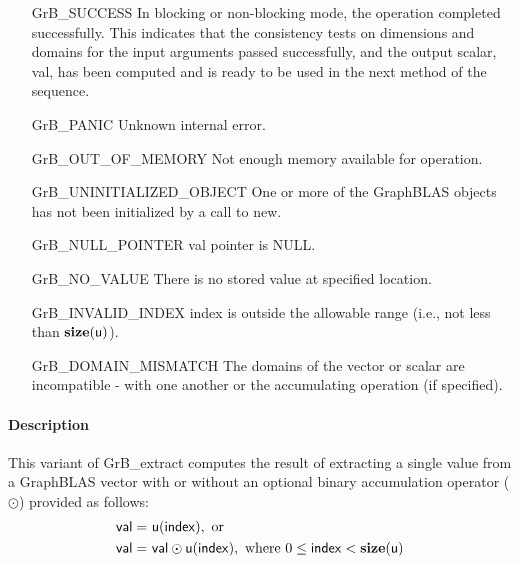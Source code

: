 \begin{itemize}[leftmargin=2.1in]
    \item[{\sf GrB\_SUCCESS}]  In blocking or non-blocking mode, the operation 
    completed successfully. This indicates that the consistency tests on 
    dimensions and domains for the input arguments passed successfully, and
    the output scalar, {\sf val}, has been computed and is ready to be used in 
    the next method of the sequence.

    \item[{\sf GrB\_PANIC}]   Unknown internal error.
    
    \item[{\sf GrB\_OUT\_OF\_MEMORY}]  Not enough memory available for operation.
    
    \item[{\sf GrB\_UNINITIALIZED\_OBJECT}]  One or more of the GraphBLAS 
    objects has not been initialized by a call to {\sf new}.
    
    \item[{\sf GrB\_NULL\_POINTER}]    {\sf val} pointer is {\sf NULL}.

    \item[{\sf GrB\_NO\_VALUE}]  There is no stored value at specified location.
    
    \item[{\sf GrB\_INVALID\_INDEX}]  {\sf index} is outside the allowable range
    (i.e., not less than $\bold{size}({\sf u})$).

    \item[{\sf GrB\_DOMAIN\_MISMATCH}]     The domains of the vector or scalar
    are incompatible - with one another or the accumulating operation (if specified).
\end{itemize}

\paragraph{Description}

This variant of {\sf GrB\_extract} computes the result of extracting a single
value from a GraphBLAS vector with or without an optional binary accumulation 
operator ($\odot$) provided as follows: 
\[
\begin{aligned}
    {\sf val} = &\ {\sf u}({\sf index}), \mbox{~or~}
    \\
    {\sf val} = &\ {\sf val} \odot {\sf u}({\sf index}),
    \mbox{ where }  0 \leq {\sf index} < \bold{size}({\sf u})
\end{aligned} 
\]

